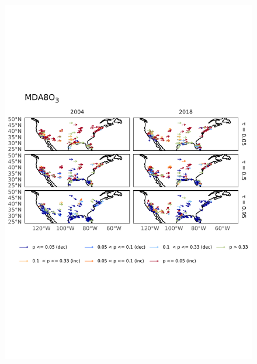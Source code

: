 \documentclass[journal abbreviation, manuscript]{copernicus}
\begin{document}
\begin{figure}[h!]
\centering
\includegraphics[height=\textheight]{figures/paper_figures/o3_map/o3_map_piecewise_stats_freeTau_mda8_anom_all_us_o3.pdf}
\caption{}
\label{fig:o3_map_us_mda8}
\end{figure}
\end{document}
